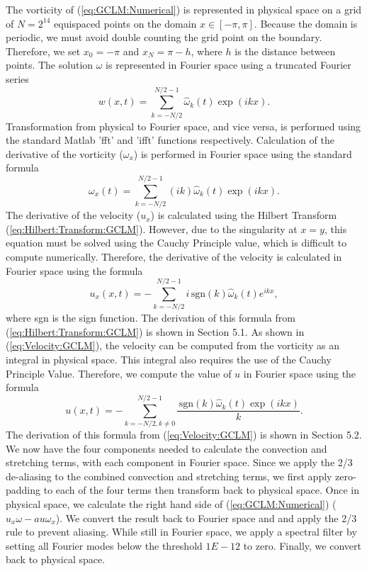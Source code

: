 \documentclass[12pt]{article}
\def\w{\omega}
\def\wx{\omega_x}
\def\wk{\hat{\omega}_k}
\def\ux{u_x}
\def\sgn{\,\text{sgn}}
\numberwithin{equation}{section}
\begin{document}
The vorticity of (\ref{eq:GCLM:Numerical}) is represented in physical space on a grid of $N = 2^{14}$ equispaced points on the domain $x\in[-\pi,\pi]$. Because the domain is periodic, we must avoid double counting the grid point on the boundary. Therefore, we set $x_0=-\pi$ and $x_N=\pi-h$, where $h$ is the distance between points. The solution $\w$ is represented in Fourier space using a truncated Fourier series
\begin{equation}\label{eq:Vorticity:Truncated:Fourier}
w(x,t) = \sum_{k=-N/2}^{N/2 - 1}\wk(t)\exp(ikx).
\end{equation}
Transformation from physical to Fourier space, and vice versa, is performed using the standard Matlab 'fft' and 'ifft' functions respectively. Calculation of the derivative of the vorticity ($\wx$) is performed in Fourier space using the standard formula
\begin{equation}\label{eq:Vorticity:Deriv}
\wx(t) = \sum_{k=-N/2}^{N/2 - 1}(ik)\wk(t)\exp(ikx).
\end{equation} 
\noindent
The derivative of the velocity ($\ux$) is calculated using the Hilbert Transform (\ref{eq:Hilbert:Transform:GCLM}). However, due to the singularity at $x=y$, this equation must be solved using the Cauchy Principle value, which is difficult to compute numerically. Therefore, the derivative of the velocity is calculated in Fourier space using the formula
\begin{equation}\label{eq:Velocity:Deriv:Fourier}
u_x(x,t) = -\sum_{k=-N/2}^{N/2 - 1}i \sgn(k)\wk(t)e^{ikx},
\end{equation}
where sgn is the sign function. The derivation of this formula from (\ref{eq:Hilbert:Transform:GCLM}) is shown in Section 5.1. As shown in (\ref{eq:Velocity:GCLM}), the velocity can be computed from the vorticity as an integral in physical space. This integral also requires the use of the Cauchy Principle Value. Therefore, we compute the value of $u$ in Fourier space using the formula
\begin{equation}\label{eq:Velocity:Fourier}
u(x,t) = -\sum_{k=-N/2,k\neq 0}^{N/2 - 1}\frac{\sgn(k)\wk(t)\exp(ikx)}{k}.
\end{equation}
The derivation of this formula from (\ref{eq:Velocity:GCLM}) is shown in Section 5.2. We now have the four components needed to calculate the convection and stretching terms, with each component in Fourier space. Since we apply the 2/3 de-aliasing to the combined convection and stretching terms, we first apply zero-padding to each of the four terms then transform back to physical space. Once in physical space, we calculate the right hand side of (\ref{eq:GCLM:Numerical}) ($u_x\w - au\wx$). We convert the result back to Fourier space and and apply the 2/3 rule to prevent aliasing. While still in Fourier space, we apply a spectral filter by setting all Fourier modes below the threshold $1E-12$ to zero. Finally, we convert back to physical space.
\end{document}
